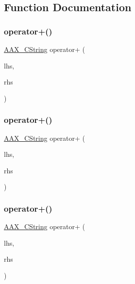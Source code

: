 \subsection{Function Documentation}
\mbox{\label{a00476_a5bf83a824cd277ac11bd58486a49ce1d}} 
\subsubsection{\texorpdfstring{operator+()}{operator+()}\hspace{0.1cm}{\footnotesize\ttfamily [1/3]}}
{\footnotesize\ttfamily \mbox{\hyperlink{a01573}{A\+A\+X\+\_\+\+C\+String}} operator+ (\begin{DoxyParamCaption}\item[{\mbox{\hyperlink{a01573}{A\+A\+X\+\_\+\+C\+String}}}]{lhs,  }\item[{const \mbox{\hyperlink{a01573}{A\+A\+X\+\_\+\+C\+String}} \&}]{rhs }\end{DoxyParamCaption})\hspace{0.3cm}{\ttfamily [inline]}}

\mbox{\label{a00476_a8e2b213f22b3491833529fede1e9af40}} 
\subsubsection{\texorpdfstring{operator+()}{operator+()}\hspace{0.1cm}{\footnotesize\ttfamily [2/3]}}
{\footnotesize\ttfamily \mbox{\hyperlink{a01573}{A\+A\+X\+\_\+\+C\+String}} operator+ (\begin{DoxyParamCaption}\item[{\mbox{\hyperlink{a01573}{A\+A\+X\+\_\+\+C\+String}}}]{lhs,  }\item[{const char $\ast$}]{rhs }\end{DoxyParamCaption})\hspace{0.3cm}{\ttfamily [inline]}}

\mbox{\label{a00476_ac422f2c6ebf5186deec4a94480709747}} 
\subsubsection{\texorpdfstring{operator+()}{operator+()}\hspace{0.1cm}{\footnotesize\ttfamily [3/3]}}
{\footnotesize\ttfamily \mbox{\hyperlink{a01573}{A\+A\+X\+\_\+\+C\+String}} operator+ (\begin{DoxyParamCaption}\item[{const char $\ast$}]{lhs,  }\item[{const \mbox{\hyperlink{a01573}{A\+A\+X\+\_\+\+C\+String}} \&}]{rhs }\end{DoxyParamCaption})\hspace{0.3cm}{\ttfamily [inline]}}

